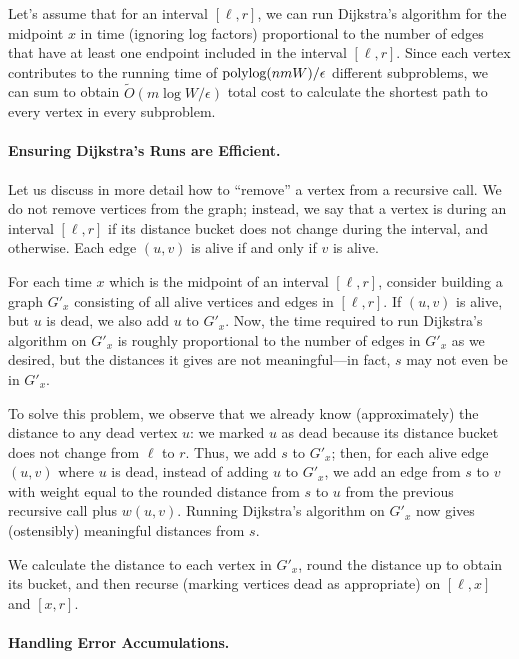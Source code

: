 Let's assume that for an interval $[\ell, r]$, we can run Dijkstra's algorithm for the midpoint $x$ in time (ignoring log factors) proportional to the number of edges that have at least one endpoint included in the interval $[\ell, r]$. 
Since each vertex contributes to the running time of $\text{polylog}(nmW)/\epsilon$ different subproblems, we can sum to obtain $\tilde{O}(m\log W/\epsilon)$ total cost to calculate the shortest path to every vertex in every subproblem.

\paragraph{Ensuring Dijkstra's Runs are Efficient.}
Let us discuss in more detail how to ``remove'' a vertex from a recursive call.
We do not remove vertices from the graph; instead, we say that a vertex is  during an interval $[\ell, r]$ if its distance bucket does not change during the interval, and  otherwise.
Each edge $(u,v)$ is alive if and only if $v$ is alive.
  
For each time $x$  which is the midpoint of an interval $[\ell, r]$, consider building a graph $G'_x$
consisting of all alive vertices and edges in $[\ell, r]$.  If $(u,v)$ is alive, but $u$ is dead, we also add $u$ to $G'_x$.
Now, the time required to run Dijkstra's algorithm on $G'_x$ is roughly proportional to the number of edges in $G'_x$ as we desired, but the distances it gives are not meaningful---in fact, $s$ may not even be in $G'_x$.

To solve this problem, we observe that we already know (approximately) the distance to any dead vertex $u$: we marked $u$ as dead because its distance bucket does not change from $\ell$ to $r$.  Thus, we add $s$ to $G'_x$; then, for each alive edge $(u,v)$ where $u$ is dead, instead of adding $u$ to $G'_x$, we add an edge from $s$ to $v$ with weight equal to the rounded distance from $s$ to $u$ from the previous recursive call plus $w(u,v)$.
Running Dijkstra's algorithm on $G'_x$ now gives (ostensibly) meaningful distances from $s$.

We calculate the distance to each vertex in $G'_x$, round the distance up to obtain its bucket, and then recurse (marking vertices dead as appropriate) on $[\ell, x]$ and $[x, r]$.

\paragraph{Handling Error Accumulations.}

